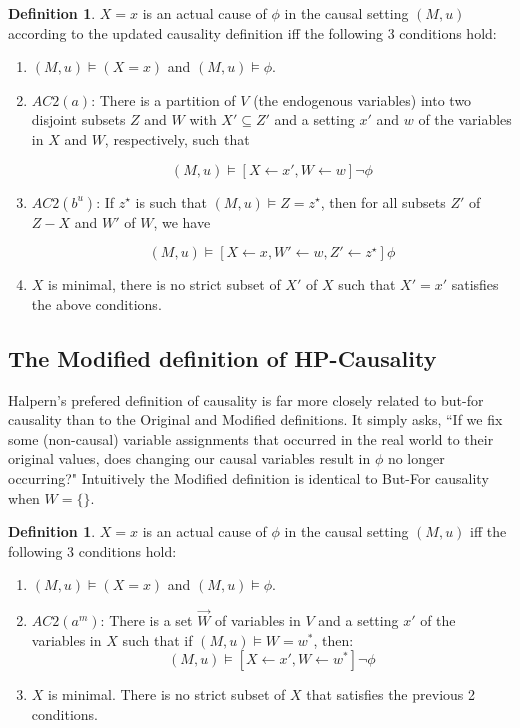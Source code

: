 \documentclass{article}
\theoremstyle{plain}
\theoremstyle{definition}
\newtheorem{defn}[thm]{Definition} %
\begin{document}
\begin{defn}$X=x$ is an actual cause of $\phi$ in the causal setting $(M,u)$ according to the updated causality definition iff the following 3 conditions hold:
\begin{enumerate}
\item $(M,u) \models (X=x)$ and $(M,u) \models \phi$.
\item $AC2(a)$: There is a partition of $V$ (the endogenous variables) into two disjoint subsets $Z$ and $W$ with $X'\subseteq Z'$ and a setting $x'$ and $w$ of the variables in $X$ and $W$, respectively, such that

\[
(M,u) \models [X\leftarrow x', W\leftarrow w]\lnot \phi
\] 

\item $AC2(b^u)$: If $z^\star$ is such that $(M,u)\models Z = z^\star$, then for all subsets $Z'$ of $Z-X$ and $W'$ of $W$, we have

\[
(M,u) \models [X\leftarrow x, W' \leftarrow w, Z' \leftarrow z^\star]\phi
\] 

\item $X$ is minimal, there is no strict subset of $X'$ of $X$ such that $X' = x'$ satisfies the above conditions.
\end{enumerate}

\end{defn}













\subsection{The Modified definition of HP-Causality} \label{sec:modified}

Halpern's prefered definition of causality is far more closely related to but-for causality than to the Original and Modified definitions. It simply asks, ``If we fix some (non-causal) variable assignments that occurred in the real world to their original values, does changing our causal variables result in $\phi$ no longer occurring?" Intuitively the Modified definition is identical to But-For causality when $W=\{\}$.

\begin{defn}$X=x$ is an actual cause of $\phi$ in the causal setting $(M,u)$ iff the following 3 conditions hold:
\begin{enumerate}
\item $(M,u) \models (X=x)$ and $(M,u) \models \phi$.
\item $AC2(a^m)$: There is a set $\vec{W}$ of variables in $V$ and a setting $x'$ of the variables in $X$ such that if $(M,u) \models W = w^*$, then:
\[
(M,u) \models [X \leftarrow x', W \leftarrow w^*] \neg \phi
\]
\item $X$ is minimal. There is no strict subset of $X$ that satisfies the previous 2 conditions.
\end{enumerate}

\end{defn}
\end{document}
